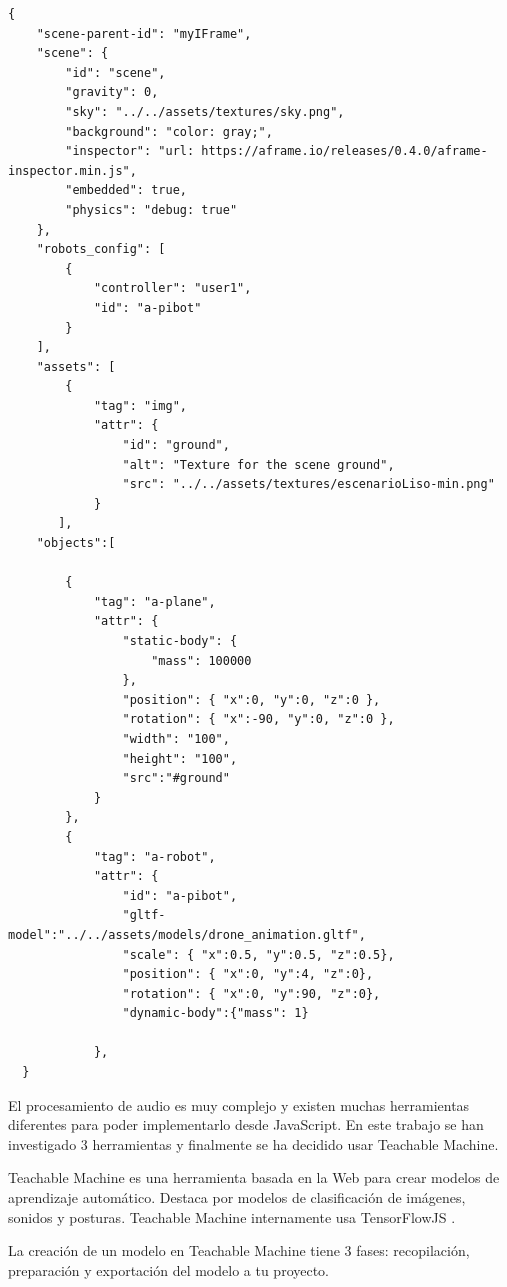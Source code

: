 \begin{lstlisting}
{
    "scene-parent-id": "myIFrame",
    "scene": {
        "id": "scene",
        "gravity": 0,
        "sky": "../../assets/textures/sky.png",
        "background": "color: gray;",
        "inspector": "url: https://aframe.io/releases/0.4.0/aframe-inspector.min.js",
        "embedded": true,
        "physics": "debug: true"
    },
    "robots_config": [
        {
            "controller": "user1",
            "id": "a-pibot"
        }
    ],
    "assets": [
        {
            "tag": "img",
            "attr": {
                "id": "ground",
                "alt": "Texture for the scene ground",
                "src": "../../assets/textures/escenarioLiso-min.png"
            }
       ],
    "objects":[
     
        {
            "tag": "a-plane",
            "attr": {
                "static-body": {
                    "mass": 100000
                },
                "position": { "x":0, "y":0, "z":0 },
                "rotation": { "x":-90, "y":0, "z":0 },
                "width": "100",
                "height": "100",
                "src":"#ground"
            }
        },
        {
            "tag": "a-robot",
            "attr": {
                "id": "a-pibot",
                "gltf-model":"../../assets/models/drone_animation.gltf",
                "scale": { "x":0.5, "y":0.5, "z":0.5},
                "position": { "x":0, "y":4, "z":0},
                "rotation": { "x":0, "y":90, "z":0},
                "dynamic-body":{"mass": 1}

            },      
  }
\end{lstlisting}



El procesamiento de audio es muy complejo y existen muchas herramientas diferentes para poder implementarlo desde JavaScript. En este trabajo se han investigado 3 herramientas y finalmente se ha decidido usar Teachable Machine.

Teachable Machine es una herramienta basada en la Web para crear modelos de aprendizaje automático. Destaca por modelos de clasificación de imágenes, sonidos y posturas. Teachable Machine internamente usa TensorFlowJS . 

La creación de un modelo en Teachable Machine tiene 3 fases: recopilación, preparación y exportación del modelo a tu proyecto.

